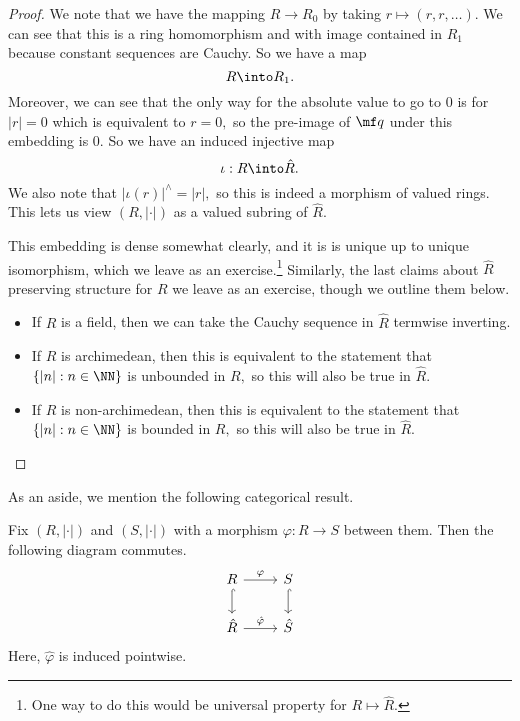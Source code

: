 \begin{proof}
	We note that we have the mapping $R\to R_0$ by taking $r\mapsto(r,r,\ldots).$ We can see that this is a ring homomorphism and with image contained in $R_1$ because constant sequences are Cauchy. So we have a map
	\[R\into R_1.\]
	Moreover, we can see that the only way for the absolute value to go to $0$ is for $|r|=0$ which is equivalent to $r=0,$ so the pre-image of $\mf q$ under this embedding is $0.$ So we have an induced injective map
	\[\iota:R\into\hat R.\]
	We also note that $|\iota(r)|^\wedge=|r|,$ so this is indeed a morphism of valued rings. This lets us view $(R,|\cdot|)$ as a valued subring of $\hat R.$

	This embedding is dense somewhat clearly, and it is is unique up to unique isomorphism, which we leave as an exercise.\footnote{One way to do this would be universal property for $R\mapsto\hat R.$} Similarly, the last claims about $\hat R$ preserving structure for $R$ we leave as an exercise, though we outline them below.
	\begin{itemize}
		\item If $R$ is a field, then we can take the Cauchy sequence in $\hat R$ termwise inverting.
		\item If $R$ is archimedean, then this is equivalent to the statement that $\{|n|:n\in\NN\}$ is unbounded in $R,$ so this will also be true in $\hat R.$
		\item If $R$ is non-archimedean, then this is equivalent to the statement that $\{|n|:n\in\NN\}$ is bounded in $R,$ so this will also be true in $\hat R.$
		\qedhere
	\end{itemize}
\end{proof}
As an aside, we mention the following categorical result.
\begin{proposition}
	Fix $(R,|\cdot|)$ and $(S,|\cdot|)$ with a morphism $\varphi:R\to S$ between them. Then the following diagram commutes.
	\[\begin{tikzcd}
		R & S \\
		{\hat R} & {\hat S}
		\arrow["\varphi", from=1-1, to=1-2]
		\arrow["\hat\varphi", from=2-1, to=2-2]
		\arrow[hook, from=1-1, to=2-1]
		\arrow[hook, from=1-2, to=2-2]
	\end{tikzcd}\]
	Here, $\hat\varphi$ is induced pointwise.
\end{proposition}
